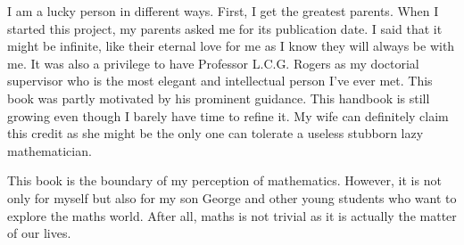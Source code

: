 I am a lucky person in different ways. First, I get the greatest parents. When I started this project, my parents asked me for its publication date. I said that it might be infinite, like their eternal love for me as I know they will always be with me. It was also a privilege to have Professor L.C.G. Rogers as my doctorial supervisor who is the most elegant and intellectual person I've ever met. This book was partly motivated by his prominent guidance. This handbook is still growing even though I barely have time to refine it. My wife can definitely claim this credit as she might be the only one can tolerate a useless stubborn lazy mathematician.

This book is the boundary of my perception of mathematics. However, it is not only for myself but also for my son George and other young students who want to explore the maths world. After all, maths is not trivial as it is actually the matter of our lives.

$\qquad$


